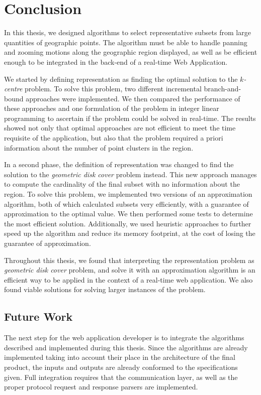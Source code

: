\cleardoublepage
\chapter{Conclusion}
\label{chap:conc}

In this thesis, we designed algorithms to select representative subsets from large quantities of geographic points. The algorithm must be able to handle panning and zooming motions along the geographic region displayed, as well as be efficient enough to be integrated in the back-end of a real-time Web Application. 

We started by defining representation as finding the optimal solution to the \emph{$k$-centre} problem. To solve this problem, two different incremental branch-and-bound approaches were implemented. We then compared the performance of these approaches and one formulation of the problem in integer linear programming to ascertain if the problem could be solved in real-time. The results showed not only that optimal approaches are not efficient to meet the time requisite of the application, but also that the problem required a priori information about the number of point clusters in the region.

In a second phase, the definition of representation was changed to find the solution to the \emph{geometric disk cover} problem instead. This new approach manages to compute the cardinality of the final subset with no information about the region. To solve this problem, we implemented two versions of an approximation algorithm, both of which calculated subsets very efficiently, with a guarantee of approximation to the optimal value. We then performed some tests to determine the most efficient solution. Additionally, we used heuristic approaches to further speed up the algorithm and reduce its memory footprint, at the cost of losing the guarantee of approximation.

Throughout this thesis, we found that interpreting the representation problem as \emph{geometric disk cover} problem, and solve it with an approximation algorithm is an efficient way to be applied in the context of a real-time web application. We also found viable solutions for solving larger instances of the problem.

\section{Future Work}
The next step for the web application developer is to integrate the algorithms described and implemented during this thesis. Since the algorithms are already implemented taking into account their place in the architecture of the final product, the inputs and outputs are already conformed to the specifications given. Full integration requires that the communication layer, as well as the proper protocol request and response parsers are implemented.

